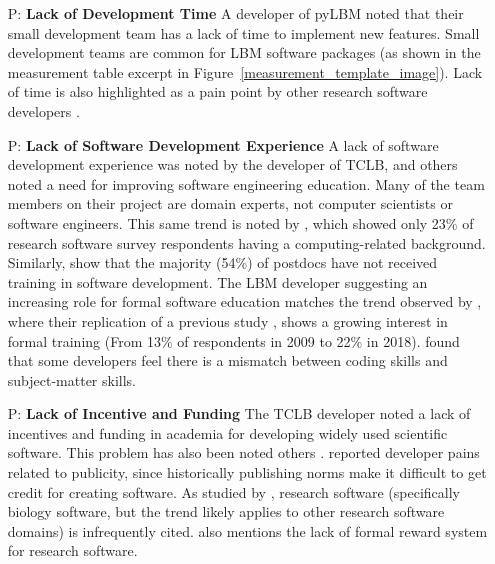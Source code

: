 \documentclass[runningheads]{llncs}
\newcounter{pnum} %
\begin{document}
\begin{enumerate}

	\item[P\refstepcounter{pnum}\thepnum \label{P_LackDevTime}:] \textbf{Lack of
	Development Time} A developer of pyLBM noted that their small development
	team has a lack of time to implement new features. Small development teams
	are common for LBM software packages (as shown in the measurement table
	excerpt in Figure~\ref{measurement_template_image}). Lack of time is also
	highlighted as a pain point by other research software developers
	\cite{PintoEtAl2018,PintoEtAl2016,WieseEtAl2019}.

	\item[P\refstepcounter{pnum}\thepnum \label{P_LackSoftDevExp}:] \textbf{Lack
	of Software Development Experience} A lack of software development
	experience was noted by the developer of TCLB, and others noted a need for
	improving software engineering education. Many of the team members on their
	project are domain experts, not computer scientists or software engineers.
	This same trend is noted by \cite{Nguyen-HoanEtAl2010}, which showed only
	23\% of research software survey respondents having a computing-related
	background. Similarly, \cite{UditAndKatz2017} show that the majority (54\%)
	of postdocs have not received training in software development.  The LBM
	developer suggesting an increasing role for formal software education
	matches the trend observed by \cite{PintoEtAl2018}, where their replication
	of a previous study \cite{HannayEtAl2009}, shows a growing interest in
	formal training (From 13\% of respondents in 2009 to 22\% in 2018).
	\cite{PintoEtAl2018} found that some developers feel there is a mismatch
	between coding skills and subject-matter skills. 
	
	\item[P\refstepcounter{pnum}\thepnum \label{P_LackFunding}:] \textbf{Lack of
	Incentive and Funding} The TCLB developer noted a lack of incentives and
	funding in academia for developing widely used scientific software. This
	problem has also been noted others \cite{gewaltig2012quality,Goble2014,KaterbowAndFeulner2018}.  \cite{WieseEtAl2019} reported developer pains
	related to publicity, since historically publishing norms make it difficult
	to get credit for creating software.  As studied by
	\cite{HowisonAndBullard2016}, research software (specifically biology
	software, but the trend likely applies to other research software domains)
	is infrequently cited.  \cite{PintoEtAl2018} also mentions the lack of
	formal reward system for research software.


\end{enumerate}
\end{document}
